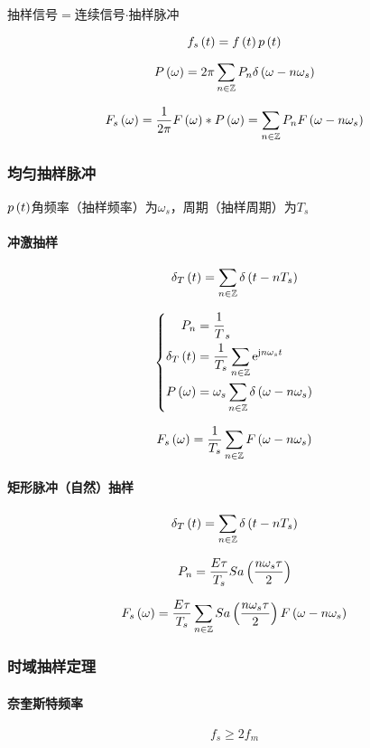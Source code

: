 \documentclass{article}
\begin{document}
抽样信号$=$连续信号$\cdot$抽样脉冲

\[f_s\left(t\right)=f\left(t\right) p\left(t\right)\]

\[P\left(\omega\right)=2\pi\sum_{n\in\mathbb Z} P_n\delta\left(\omega-n\omega_s\right)\]

\[F_s\left(\omega\right)=\frac1{2\pi}F\left(\omega\right)\ast P\left(\omega\right)=\sum_{n\in\mathbb Z} P_nF\left(\omega-n\omega_s\right)\]

\subsubsection{均匀抽样脉冲}

$p\left(t\right)$角频率（抽样频率）为$\omega_s$，周期（抽样周期）为$T_s$

\paragraph{冲激抽样}

\[\delta_T\left(t\right)=\sum_{n\in\mathbb Z}\delta\left(t-nT_s\right)\]

\[\left\{\begin{aligned}
        P_n              & =\frac1T_s                                   \\
        \delta_T\left(t\right) & =\frac1{T_s}\sum_{n\in\mathbb Z}\mathrm e^{\mathrm j n\omega_s t}        \\
        P\left(\omega\right)   & =\omega_s\sum_{n\in\mathbb Z}\delta\left(\omega-n\omega_s\right)
    \end{aligned}\right.\]

\[F_s\left(\omega\right)=\frac1{T_s}\sum_{n\in\mathbb Z} F\left(\omega-n\omega_s\right)\]

\paragraph{矩形脉冲（自然）抽样}

\[\delta_T\left(t\right)=\sum_{n\in\mathbb Z}\delta\left(t-nT_s\right)\]

\[P_n=\frac{E\tau}{T_s}Sa\left(\frac{n\omega_s\tau}2\right)\]

\[F_s\left(\omega\right)=\frac{E\tau}{T_s}\sum_{n\in\mathbb Z} Sa\left(\frac{n\omega_s\tau}2\right)F\left(\omega-n\omega_s\right)\]

\subsubsection{时域抽样定理}

\paragraph{奈奎斯特频率}

\[f_s\geqslant2f_m\]
\end{document}

